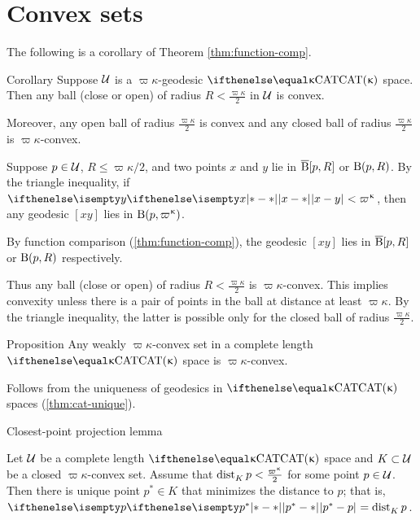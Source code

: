 \section{Convex sets}\label{sec:convex-CBA}

The following is a corollary of Theorem \ref{thm:function-comp}.

\begin{thm}{Corollary}\label{cor:convex-balls}
Suppose $\mathcal{U}$ is a $\varpi\kappa$-geodesic $\CAT\kappa$ space.
Then any ball (close or open) of radius $R<\tfrac{\varpi\kappa}2$ in $\mathcal{U}$ is convex.

Moreover, any open ball of radius $\tfrac{\varpi\kappa}2$ is convex
and any closed ball of radius $\tfrac{\varpi\kappa}2$ is $\varpi\kappa$-convex.
\end{thm}

Suppose $p\in\spc{U}$, $ R\le\varpi\kappa/2$,  and two points 
$x$ and $y$ lie in $\overline{\mathrm{B}}{}[p, R]$ or $\mathrm{B}{}(p, R)$.
By the triangle inequality, if $\dist{x}{y}{}<\varpi\kappa$, then any
 geodesic $[x y]$ lies in $\oBall(p, \varpi\kappa)$.
 
By function comparison (\ref{thm:function-comp}), 
the geodesic $[x y]$ lies in $\overline{\mathrm{B}}{}[p,R]$ or $\mathrm{B}{}(p,R)$ respectively.

Thus any ball (close or open) of radius $R<\tfrac{\varpi\kappa}2$ is $\varpi\kappa$-convex.
This implies convexity unless there is a pair of points in the ball at distance at least $\varpi\kappa$.
By the  triangle inequality, the latter is possible only for the closed ball of radius $\tfrac{\varpi\kappa}2$.
\qeds

\begin{thm}{Proposition}
Any weakly $\varpi\kappa$-convex set 
in a complete length $\CAT\kappa$ space is $\varpi\kappa$-convex.
\end{thm}

Follows from the uniqueness of geodesics in $\CAT\kappa$ spaces (\ref{thm:cat-unique}).
\qeds


\begin{thm}{Closest-point projection lemma}\label{lem:closest point}{\sloppy 
Let $\mathcal{U}$ be a complete length $\CAT\kappa$ space and $K\subset \spc{U}$ be a closed $\varpi\kappa$-convex set. 
Assume that $\distfun{K}{p}{}<\tfrac{\varpi\kappa}2$ for some point $p\in \spc{U}$.
Then  
there is unique point $p^*\in K$ that minimizes the distance to $p$;
that is, $\dist{p^*}{p}{}=\distfun{K}{p}{}$. 

}

\end{thm}

